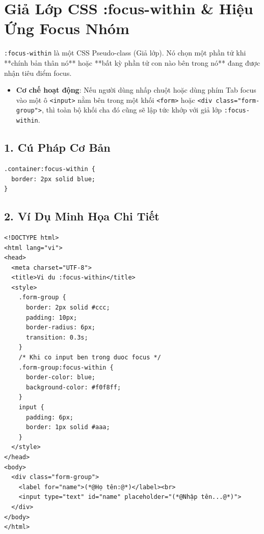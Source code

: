 \documentclass[11pt,oneside]{book}
\newcommand{\codeinline}[1]{\textcolor{accentOrange}{\texttt{#1}}}
\begin{document}
\section{Giả Lớp CSS :focus-within \& Hiệu Ứng Focus Nhóm}
\label{sec:css_focus_within}

\begin{conceptBox}
\codeinline{:focus-within} là một CSS Pseudo-class (Giả lớp). Nó chọn một phần tử khi **chính bản thân nó** hoặc **bất kỳ phần tử con nào bên trong nó** đang được nhận tiêu điểm focus.
\par\vspace{4pt}
\begin{itemize}[leftmargin=1.5em, itemsep=2pt, parsep=0pt]
    \item \textbf{Cơ chế hoạt động}: Nếu người dùng nhấp chuột hoặc dùng phím Tab focus vào một ô \codeinline{<input>} nằm bên trong một khối \codeinline{<form>} hoặc \codeinline{<div class="form-group">}, thì toàn bộ khối cha đó cũng sẽ lập tức khớp với giả lớp \codeinline{:focus-within}.
\end{itemize}
\end{conceptBox}

\subsection{1. Cú Pháp Cơ Bản}
\begin{codeWindow}
\begin{lstlisting}[language=HTML5]
.container:focus-within {
  border: 2px solid blue;
}
\end{lstlisting}
\end{codeWindow}

\subsection{2. Ví Dụ Minh Họa Chi Tiết}

\begin{codeWindow}
\begin{lstlisting}[language=HTML5]
<!DOCTYPE html>
<html lang="vi">
<head>
  <meta charset="UTF-8">
  <title>Vi du :focus-within</title>
  <style>
    .form-group {
      border: 2px solid #ccc;
      padding: 10px;
      border-radius: 6px;
      transition: 0.3s;
    }
    /* Khi co input ben trong duoc focus */
    .form-group:focus-within {
      border-color: blue;
      background-color: #f0f8ff;
    }
    input {
      padding: 6px;
      border: 1px solid #aaa;
    }
  </style>
</head>
<body>
  <div class="form-group">
    <label for="name">(*@Họ tên:@*)</label><br>
    <input type="text" id="name" placeholder="(*@Nhập tên...@*)">
  </div>
</body>
</html>
\end{lstlisting}
\end{codeWindow}
\end{document}

